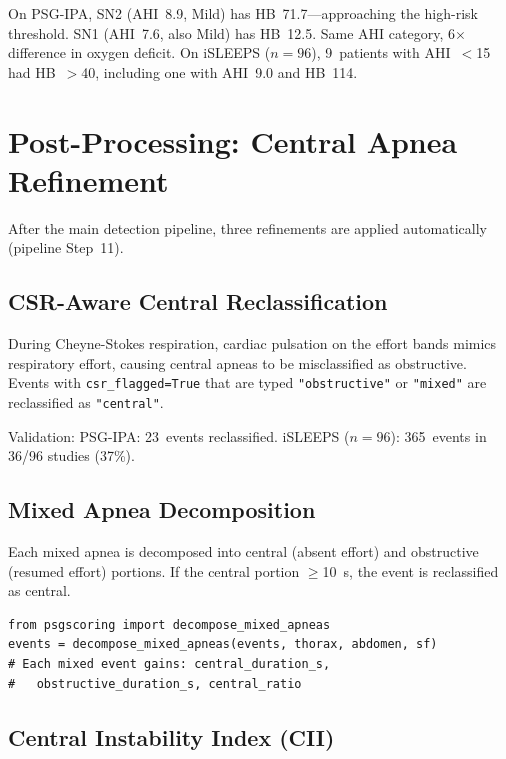 \documentclass[11pt,a4paper]{article}
\begin{document}
On PSG-IPA, SN2 (AHI~8.9, Mild) has HB~71.7---approaching the
high-risk threshold. SN1 (AHI~7.6, also Mild) has HB~12.5. Same
AHI category, 6$\times$ difference in oxygen deficit. On iSLEEPS
($n=96$), 9~patients with AHI~$<$15 had HB~$>$40, including one with
AHI~9.0 and HB~114.

\section{Post-Processing: Central Apnea Refinement}
\label{sec:postprocess}

After the main detection pipeline, three refinements are applied
automatically (pipeline Step~11).

\subsection{CSR-Aware Central Reclassification}

During Cheyne-Stokes respiration, cardiac pulsation on the effort
bands mimics respiratory effort, causing central apneas to be
misclassified as obstructive. Events with \texttt{csr\_flagged=True}
that are typed \texttt{"obstructive"} or \texttt{"mixed"} are
reclassified as \texttt{"central"}.

Validation: PSG-IPA: 23~events reclassified. iSLEEPS ($n=96$):
365~events in 36/96 studies (37\%).

\subsection{Mixed Apnea Decomposition}

Each mixed apnea is decomposed into central (absent effort) and
obstructive (resumed effort) portions. If the central portion
$\geq$10~s, the event is reclassified as central.

\begin{lstlisting}
from psgscoring import decompose_mixed_apneas
events = decompose_mixed_apneas(events, thorax, abdomen, sf)
# Each mixed event gains: central_duration_s,
#   obstructive_duration_s, central_ratio
\end{lstlisting}

\subsection{Central Instability Index (CII)}
\end{document}

